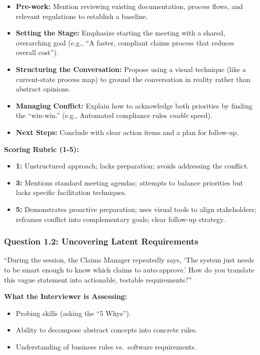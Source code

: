 \documentclass[
  11pt,
  openany,
  oneside]{book}
\providecommand{\tightlist}{%
  \setlength{\itemsep}{0pt}\setlength{\parskip}{0pt}}
\begin{document}
\begin{itemize}
\tightlist
\item
  \textbf{Pre-work:} Mention reviewing existing documentation, process
  flows, and relevant regulations to establish a baseline.
\item
  \textbf{Setting the Stage:} Emphasize starting the meeting with a
  shared, overarching goal (e.g., ``A faster, compliant claims process
  that reduces overall cost'').
\item
  \textbf{Structuring the Conversation:} Propose using a visual
  technique (like a current-state process map) to ground the
  conversation in reality rather than abstract opinions.
\item
  \textbf{Managing Conflict:} Explain how to acknowledge both priorities
  by finding the ``win-win.'' (e.g., Automated compliance rules
  \emph{enable} speed).
\item
  \textbf{Next Steps:} Conclude with clear action items and a plan for
  follow-up.
\end{itemize}

\textbf{Scoring Rubric (1-5):}

\begin{itemize}
\tightlist
\item
  \textbf{1:} Unstructured approach; lacks preparation; avoids
  addressing the conflict.
\item
  \textbf{3:} Mentions standard meeting agendas; attempts to balance
  priorities but lacks specific facilitation techniques.
\item
  \textbf{5:} Demonstrates proactive preparation; uses visual tools to
  align stakeholders; reframes conflict into complementary goals; clear
  follow-up strategy.
\end{itemize}

\subsubsection{Question 1.2: Uncovering Latent
Requirements}\label{question-1.2-uncovering-latent-requirements}

``During the session, the Claims Manager repeatedly says, `The system
just needs to be smart enough to know which claims to auto-approve.' How
do you translate this vague statement into actionable, testable
requirements?''

\textbf{What the Interviewer is Assessing:}

\begin{itemize}
\tightlist
\item
  Probing skills (asking the ``5 Whys'').
\item
  Ability to decompose abstract concepts into concrete rules.
\item
  Understanding of business rules vs.~software requirements.
\end{itemize}
\end{document}

